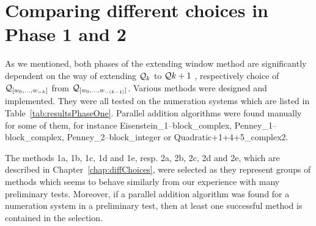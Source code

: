 

\section{Comparing different choices in Phase 1 and 2}
\label{sec:compareMethods}

As we mentioned, both phases of the extending window method are significantly dependent on the way of extending $\mathcal{Q}_k$ to $\mathcal{Q}{k+1}$ , respectively choice of $\mathcal{Q}_{[w_{0}, \dots, w_{-k}]}$ from $\mathcal{Q}_{[w_{0}, \dots, w_{-(k-1)}]}$. Various methods were designed and implemented. They were all tested on the numeration systems which are listed in Table~\ref{tab:resultsPhaseOne}. Parallel addition algorithms were found manually~\cite{milena} for some of them, for instance Eisenstein\_1--block\_complex, Penney\_1--block\_complex, Penney\_2--block\_integer or Quadratic+1+4+5\_complex2. 

The methods 1a, 1b, 1c, 1d and 1e, resp. 2a, 2b, 2c, 2d and 2e, which are described in Chapter~\ref{chap:diffChoices}, were selected as they represent groups of methods which seems to behave similarly from our experience with many preliminary tests. Moreover, if a parallel addition algorithm was found for a numeration system in a preliminary test, then at least one successful method is contained in the selection.



